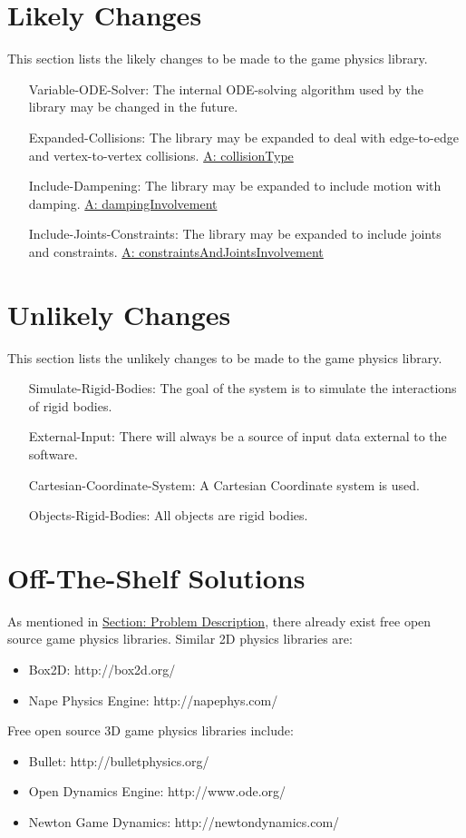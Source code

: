 \documentclass[12pt]{article}
\begin{document}
\section{Likely Changes}
\label{Sec:LCs}
This section lists the likely changes to be made to the game physics library.
\begin{itemize}
\item[Variable-ODE-Solver:\phantomsection\label{lcVODES}]The internal ODE-solving algorithm used by the library may be changed in the future.
\item[Expanded-Collisions:\phantomsection\label{lcEC}]The library may be expanded to deal with edge-to-edge and vertex-to-vertex collisions. \hyperref[A:collisionType]{A: collisionType}
\item[Include-Dampening:\phantomsection\label{lcID}]The library may be expanded to include motion with damping. \hyperref[A:dampingInvolvement]{A: dampingInvolvement}
\item[Include-Joints-Constraints:\phantomsection\label{lcIJC}]The library may be expanded to include joints and constraints. \hyperref[A:constraintsAndJointsInvolvement]{A: constraintsAndJointsInvolvement}
\end{itemize}
\section{Unlikely Changes}
\label{Sec:UCs}
This section lists the unlikely changes to be made to the game physics library.
\begin{itemize}
\item[Simulate-Rigid-Bodies:\phantomsection\label{ucSRB}]The goal of the system is to simulate the interactions of rigid bodies.
\item[External-Input:\phantomsection\label{ucEI}]There will always be a source of input data external to the software.
\item[Cartesian-Coordinate-System:\phantomsection\label{ucCCS}]A Cartesian Coordinate system is used.
\item[Objects-Rigid-Bodies:\phantomsection\label{ucORB}]All objects are rigid bodies.
\end{itemize}
\section{Off-The-Shelf Solutions}
\label{Sec:ExistingSolns}
As mentioned in \hyperref[Sec:ProbDesc]{Section: Problem Description}, there already exist free open source game physics libraries. Similar 2D physics libraries are:
\begin{itemize}
\item{Box2D: http://box2d.org/}
\item{Nape Physics Engine: http://napephys.com/}
\end{itemize}
Free open source 3D game physics libraries include:
\begin{itemize}
\item{Bullet: http://bulletphysics.org/}
\item{Open Dynamics Engine: http://www.ode.org/}
\item{Newton Game Dynamics: http://newtondynamics.com/}
\end{itemize}
\end{document}
